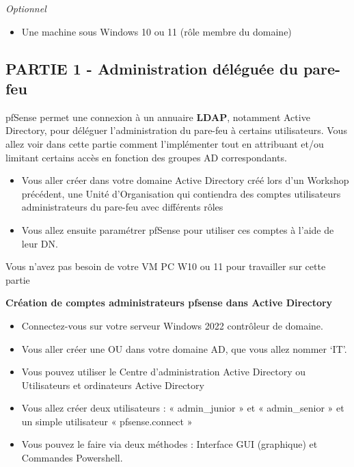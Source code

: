 \textit{Optionnel}
\begin{itemize}
  \item Une machine sous Windows 10 ou 11 (rôle membre du domaine)
\end{itemize}

\subsection*{PARTIE 1 - Administration déléguée du pare-feu}
{}

\noindent pfSense permet une connexion à un annuaire \textbf{LDAP}, notamment Active Directory, pour déléguer l'administration du pare-feu à certains utilisateurs. Vous allez voir dans cette partie comment l'implémenter tout en attribuant et/ou limitant certains accès en fonction des groupes AD correspondants.

\begin{itemize}
  \item Vous aller créer dans votre domaine Active Directory créé lors d'un Workshop précédent, une Unité d'Organisation qui contiendra des comptes utilisateurs administrateurs du pare-feu avec différents rôles
  \item Vous allez ensuite paramétrer pfSense pour utiliser ces comptes à l'aide de leur DN.
\end{itemize}

\noindent Vous n'avez pas besoin de votre VM PC W10 ou 11 pour travailler sur cette partie

\vspace{1cm}

\noindent \textbf{Création de comptes administrateurs pfsense dans Active Directory}

\begin{itemize}
  \item Connectez-vous sur votre serveur Windows 2022 contrôleur de domaine.
  \item Vous aller créer une OU dans votre domaine AD, que vous allez nommer ‘IT'.
  \item Vous pouvez utiliser le Centre d'administration Active Directory ou Utilisateurs et ordinateurs Active Directory
  \item Vous allez créer deux utilisateurs : « admin\_junior » et « admin\_senior » et un simple utilisateur « pfsense.connect »
  \item Vous pouvez le faire via deux méthodes : Interface GUI (graphique) et Commandes Powershell.
\end{itemize}

